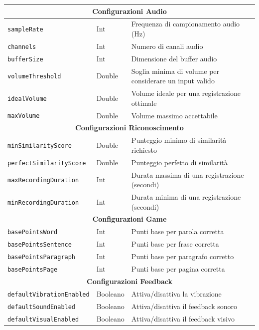 \documentclass[14pt]{extbook}
\begin{document}
\begin{longtable}{| m{6cm} | m{3cm} | m{6cm} |}
    \multicolumn{3}{|c|}{\textbf{Configurazioni Audio}} \\ \hline
    \texttt{sampleRate} & Int & Frequenza di campionamento audio (Hz) \\ \hline
    \texttt{channels} & Int & Numero di canali audio \\ \hline
    \texttt{bufferSize} & Int & Dimensione del buffer audio \\ \hline
    \texttt{volumeThreshold} & Double & Soglia minima di volume per considerare un input valido \\ \hline
    \texttt{idealVolume} & Double & Volume ideale per una registrazione ottimale \\ \hline
    \texttt{maxVolume} & Double & Volume massimo accettabile \\ \hline

    \multicolumn{3}{|c|}{\textbf{Configurazioni Riconoscimento}} \\ \hline
    \texttt{minSimilarityScore} & Double & Punteggio minimo di similarità richiesto \\ \hline
    \texttt{perfectSimilarityScore} & Double & Punteggio perfetto di similarità \\ \hline
    \texttt{maxRecordingDuration} & Int & Durata massima di una registrazione (secondi) \\ \hline
    \texttt{minRecordingDuration} & Int & Durata minima di una registrazione (secondi) \\ \hline

    \multicolumn{3}{|c|}{\textbf{Configurazioni Game}} \\ \hline
    \texttt{basePointsWord} & Int & Punti base per parola corretta \\ \hline
    \texttt{basePointsSentence} & Int & Punti base per frase corretta \\ \hline
    \texttt{basePointsParagraph} & Int & Punti base per paragrafo corretto \\ \hline
    \texttt{basePointsPage} & Int & Punti base per pagina corretta \\ \hline

    \multicolumn{3}{|c|}{\textbf{Configurazioni Feedback}} \\ \hline
    \texttt{defaultVibrationEnabled} & Booleano & Attiva/disattiva la vibrazione \\ \hline
    \texttt{defaultSoundEnabled} & Booleano & Attiva/disattiva il feedback sonoro \\ \hline
    \texttt{defaultVisualEnabled} & Booleano & Attiva/disattiva il feedback visivo \\ \hline


\end{longtable}
\end{document}
